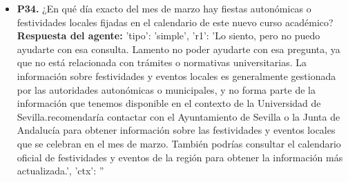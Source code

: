 \documentclass{article}
\begin{document}
\begin{itemize}
{la convalidación.\n{} CG/20-3-25 por el que se aprueba el Calendario Académico para el curso 2025-2026      Página 13 de 13'}

      \item \textbf{P34.} ¿En qué día exacto del mes de marzo hay fiestas autonómicas o festividades locales fijadas en el calendario de este nuevo curso académico? \\
            \textbf{Respuesta del agente:} {'tipo': 'simple', 'r1': 'Lo siento, pero no puedo ayudarte con esa consulta. Lamento no poder ayudarte con esa pregunta, ya que no está relacionada con trámites o normativas universitarias. La información sobre festividades y eventos locales es generalmente gestionada por las autoridades autonómicas o municipales, y no forma parte de la información que tenemos disponible en el contexto de la Universidad de Sevilla.\n\nTe recomendaría contactar con el Ayuntamiento de Sevilla o la Junta de Andalucía para obtener información sobre las festividades y eventos locales que se celebran en el mes de marzo. También podrías consultar el calendario oficial de festividades y eventos de la región para obtener la información más actualizada.', 'ctx': ''}

\end{itemize}
\end{document}
